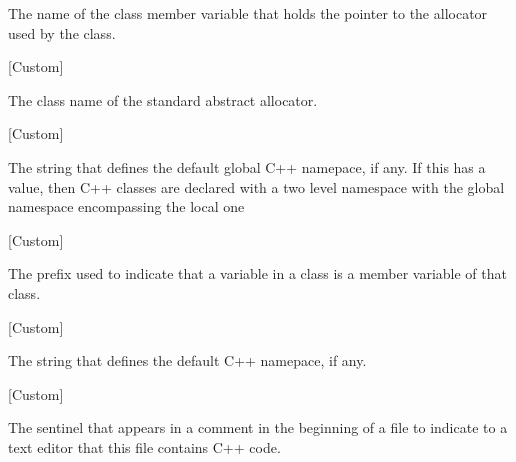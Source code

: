 \begin{doc-string}
The name of the class member variable that holds the pointer to the allocator
used by the class.
\end{doc-string}

\vspace{1em}
\noindent
{}
\usebox{\funcname}
 \hfill [Custom]

\begin{doc-string}
The class name of the standard abstract allocator.
\end{doc-string}

\vspace{1em}
\noindent
{}
\usebox{\funcname}
 \hfill [Custom]

\begin{doc-string}
The string that defines the default global C++ namepace, if any.
If this has a value, then C++ classes are declared with a two level
namespace with the global namespace encompassing the local one
\end{doc-string}

\vspace{1em}
\noindent
{}
\usebox{\funcname}
 \hfill [Custom]

\begin{doc-string}
The prefix used to indicate that a variable in a class is a member variable of
that class.
\end{doc-string}

\vspace{1em}
\noindent
{}
\usebox{\funcname}
 \hfill [Custom]

\begin{doc-string}
The string that defines the default C++ namepace, if any.
\end{doc-string}

\vspace{1em}
\noindent
{}
\usebox{\funcname}
 \hfill [Custom]

\begin{doc-string}
The sentinel that appears in a comment in the beginning of a file to indicate
to a text editor that this file contains C++ code.
\end{doc-string}

